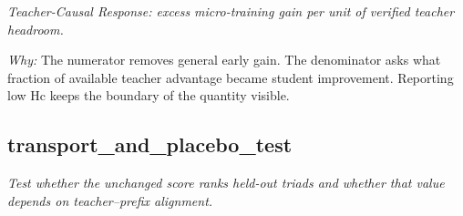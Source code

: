 \documentclass[10pt,a4paper]{article}
\begin{document}
\begin{enumerate}[leftmargin=*,start=3]
\noindent\emph{Teacher-Causal Response: excess micro-training gain per unit of verified teacher headroom.}
\par{}
\par\emph{Why:} The numerator removes general early gain. The denominator asks what fraction of available teacher advantage became student improvement. Reporting low Hc keeps the boundary of the quantity visible.
\end{enumerate}
\subsection*{transport\_and\_placebo\_test}
\emph{Test whether the unchanged score ranks held-out triads and whether that value depends on teacher--prefix alignment.}
\end{document}
